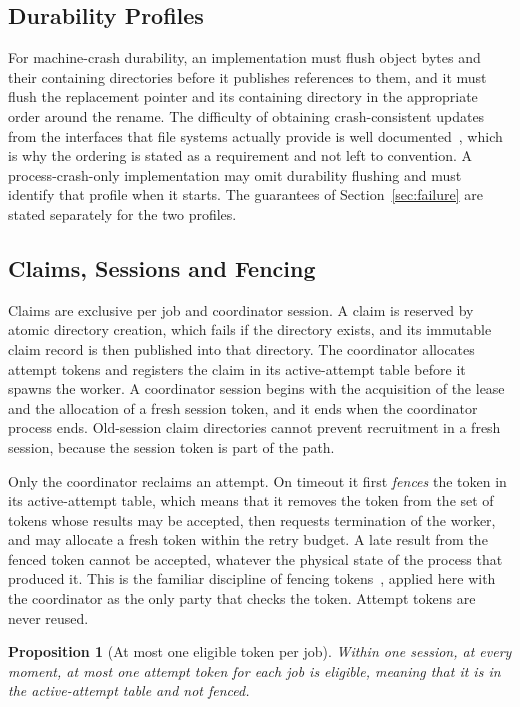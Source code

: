 \documentclass[11pt,a4paper]{article}
\theoremstyle{plain}
\newtheorem{proposition}[theorem]{Proposition}
\theoremstyle{definition}
\theoremstyle{remark}
\theoremstyle{definition}
\begin{document}
\subsection{Durability Profiles}

For machine-crash durability, an implementation must flush object bytes and their containing directories before it publishes references to them, and it must flush the replacement pointer and its containing directory in the appropriate order around the rename. The difficulty of obtaining crash-consistent updates from the interfaces that file systems actually provide is well documented~\cite{pillai2014}, which is why the ordering is stated as a requirement and not left to convention. A process-crash-only implementation may omit durability flushing and must identify that profile when it starts. The guarantees of Section~\ref{sec:failure} are stated separately for the two profiles.

\subsection{Claims, Sessions and Fencing}

Claims are exclusive per job and coordinator session. A claim is reserved by atomic directory creation, which fails if the directory exists, and its immutable claim record is then published into that directory. The coordinator allocates attempt tokens and registers the claim in its active-attempt table before it spawns the worker. A coordinator session begins with the acquisition of the lease and the allocation of a fresh session token, and it ends when the coordinator process ends. Old-session claim directories cannot prevent recruitment in a fresh session, because the session token is part of the path.

Only the coordinator reclaims an attempt. On timeout it first \emph{fences} the token in its active-attempt table, which means that it removes the token from the set of tokens whose results may be accepted, then requests termination of the worker, and may allocate a fresh token within the retry budget. A late result from the fenced token cannot be accepted, whatever the physical state of the process that produced it. This is the familiar discipline of fencing tokens~\cite{kleppmann2017}, applied here with the coordinator as the only party that checks the token. Attempt tokens are never reused.

\begin{proposition}[At most one eligible token per job]
\label{prop:token}
Within one session, at every moment, at most one attempt token for each job is eligible, meaning that it is in the active-attempt table and not fenced.
\end{proposition}
\end{document}
